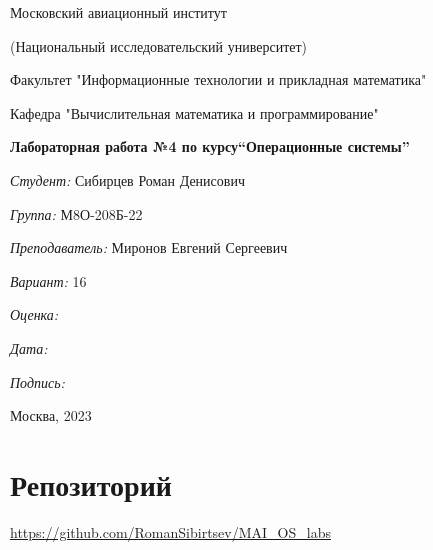 \documentclass[a4paper, 12pt]{article}
\begin{document}
\thispagestyle{empty}	
\begin{center}
	Московский авиационный институт
	
	(Национальный исследовательский университет)
	
	Факультет "Информационные технологии и прикладная математика"
	
	Кафедра "Вычислительная математика и программирование"
	
\end{center}
\vspace{40ex}
\begin{center}
	\textbf{\large{Лабораторная работа №4 по курсу\linebreak \textquotedblleft Операционные системы\textquotedblright}}
\end{center}
\vspace{35ex}
\begin{flushright}
	\textit{Студент: } Сибирцев Роман Денисович
	
	\vspace{2ex}
	\textit{Группа: } М8О-208Б-22
	
	\vspace{2ex}
	\textit{Преподаватель: } Миронов Евгений Сергеевич
	
	\vspace{2ex}
	\textit{Вариант: } 16 
	
	\vspace{2ex}
	\textit{Оценка: } \underline{\quad\quad\quad\quad\quad\quad}
	
	 \vspace{2ex}
	\textit{Дата: } \underline{\quad\quad\quad\quad\quad\quad}
	
	\vspace{2ex}
	\textit{Подпись: } \underline{\quad\quad\quad\quad\quad\quad}
	
\end{flushright}

\vspace{5ex}

\begin{vfill}
	\begin{center}
		Москва, 2023
	\end{center}	
\end{vfill}
\newpage

\begingroup
\color{black}
\tableofcontents\newpage
\endgroup

\section{Репозиторий}
\href{https://github.com/RomanSibirtsev/MAI_OS_labs}{https://github.com/RomanSibirtsev/MAI\_OS\_labs}
\end{document}
